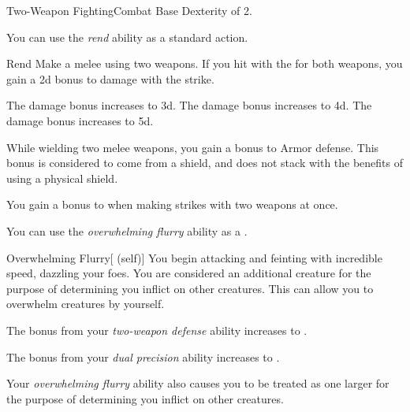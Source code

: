     \begin{feat}{Two-Weapon Fighting}{Combat}
        \featpre Base Dexterity of 2.

         You can use the \textit{rend} ability as a standard action.
        \begin{freeability}{Rend}
            Make a melee  using two weapons.
            If you hit with the  for both weapons, you gain a \plus2d bonus to damage with the strike.

            \rankline
             The damage bonus increases to \plus3d.
             The damage bonus increases to \plus4d.
             The damage bonus increases to \plus5d.
        \end{freeability}

         While wielding two melee weapons, you gain a  bonus to Armor defense.
        This bonus is considered to come from a shield, and does not stack with the benefits of using a physical shield.

         You gain a  bonus to  when making strikes with two weapons at once.

         You can use the \textit{overwhelming flurry} ability as a .
        \begin{attuneability}{Overwhelming Flurry}[ (self)]
            You begin attacking and feinting with incredible speed, dazzling your foes.
            You are considered an additional creature for the purpose of determining  you inflict on other creatures.
            This can allow you to overwhelm creatures by yourself.
        \end{attuneability}

         The bonus from your \textit{two-weapon defense} ability increases to .

         The bonus from your \textit{dual precision} ability increases to .

         Your \textit{overwhelming flurry} ability also causes you to be treated as one  larger for the purpose of determining  you inflict on other creatures.
    \end{feat}


